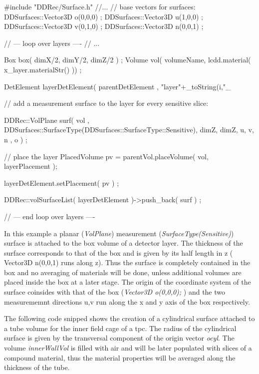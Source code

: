 \documentclass[10pt,a4paper]{article}
\begin{document}
\begin{code}
  #include "DDRec/Surface.h"
  //...
  // base vectors for surfaces:
  DDSurfaces::Vector3D o(0,0,0) ;
  DDSurfaces::Vector3D u(1,0,0) ;
  DDSurfaces::Vector3D v(0,1,0) ;
  DDSurfaces::Vector3D n(0,0,1) ;

  // --- loop over layers ----
  // ...

    Box  box( dimX/2, dimY/2, dimZ/2 ) ;
    Volume vol( volumeName, lcdd.material( x_layer.materialStr() )) ;

    DetElement layerDetElement( parentDetElement , "layer"+_toString(i,"_%

    // add a measurement surface to the layer for every sensitive slice:

    DDRec::VolPlane surf( vol , 
                          DDSurfaces::SurfaceType(DDSurfaces::SurfaceType::Sensitive),
                          dimZ, dimZ, 
                          u, v, n , o ) ; 

    // place the layer
    PlacedVolume pv = parentVol.placeVolume(  vol, layerPlacement );

    layerDetElement.setPlacement( pv ) ;

    DDRec::volSurfaceList( layerDetElement )->push_back( surf ) ;

  // --- end loop over layers ----

\end{code}
In this example a planar ({\em VolPlane}) measurement ({\em SurfaceType(Sensitive)})
surface is attached to the box volume of a detector layer.
The thickness of the surface corresponds to that of the box and is given by its half length in z
( Vector3D n(0,0,1) runs along z). Thus the surface is completely contained in 
the box and no averaging of materials will be done, unless additional volumes
are placed inside the box at a later stage. 
The origin of the coordinate system of the surface coinsides with that of the box
({\em Vector3D o(0,0,0); })
and the two measurememnt directions u,v run along the x and y axis of the box
respectively.

\noindent
The following code snipped shows the creation of a cylindrical surface attached
to a tube volume for the inner field cage of a tpc. The radius of the cylindrical
surface is given by the transversal component of the origin vector {\em ocyl}.
The volume {\em innerWallVol} is filled with air and will be later populated
with slices of a compound material, thus the material properties will be
averaged along the thickness of the tube.
\end{document}
